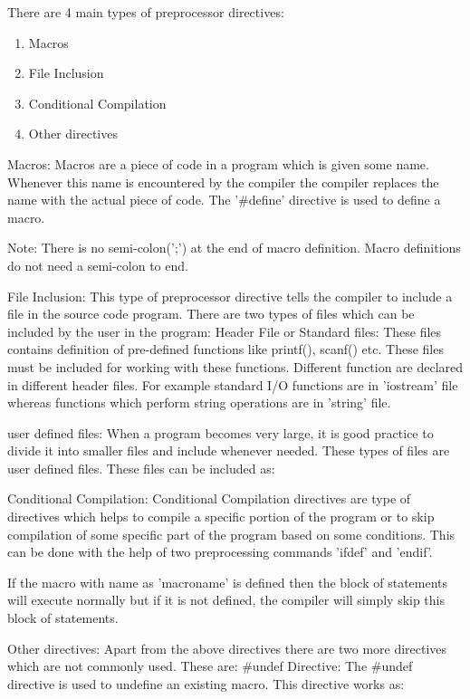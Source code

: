 \documentclass[12pt, a4paper]{article}
\begin{document}
    There are 4 main types of preprocessor directives: 
    \begin{enumerate}
        \item Macros
        \item File Inclusion
        \item Conditional Compilation
        \item Other directives
    \end{enumerate} 
    
    Macros: Macros are a piece of code in a program which is given some name. Whenever this name is encountered by the compiler the compiler replaces the name with the actual piece of code. The '\#define' directive is used to define a macro. 

    \begin{highlight}
        Note: There is no semi-colon(';') at the end of macro definition. Macro definitions do not need a semi-colon to end.
    \end{highlight}


    File Inclusion: This type of preprocessor directive tells the compiler to include a file in the source code program. There are two types of files which can be included by the user in the program: 
        Header File or Standard files: These files contains definition of pre-defined functions like printf(), scanf() etc. These files must be included for working with these functions. Different function are declared in different header files. For example standard I/O functions are in 'iostream' file whereas functions which perform string operations are in 'string' file.
        
        user defined files: When a program becomes very large, it is good practice to divide it into smaller files and include whenever needed. These types of files are user defined files. These files can be included as:


    Conditional Compilation: Conditional Compilation directives are type of directives which helps to compile a specific portion of the program or to skip compilation of some specific part of the program based on some conditions. This can be done with the help of two preprocessing commands 'ifdef' and 'endif'. 

    If the macro with name as 'macroname' is defined then the block of statements will execute normally but if it is not defined, the compiler will simply skip this block of statements. 

    Other directives: Apart from the above directives there are two more directives which are not commonly used. These are: 
    \#undef Directive: The \#undef directive is used to undefine an existing macro. This directive works as:
\end{document}
